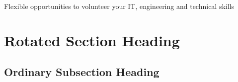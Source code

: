 \documentclass[12pt,foldmark]{leaflet}
\begin{document}
{Flexible opportunities to volunteer your IT, engineering and technical skills}

\withrotationtrue
\section{Rotated Section Heading}
\withrotationfalse
\subsection{Ordinary Subsection Heading}
\newpage

\newpage

\newpage




\end{document}
